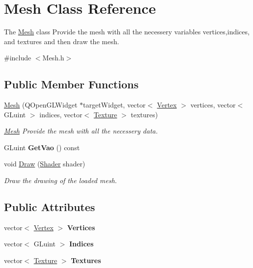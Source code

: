 \hypertarget{class_mesh}{}\section{Mesh Class Reference}
\label{class_mesh}


The \hyperlink{class_mesh}{Mesh} class Provide the mesh with all the necessery variables vertices,indices, and textures and then draw the mesh.  




{\ttfamily \#include $<$Mesh.\+h$>$}

\subsection*{Public Member Functions}
\begin{DoxyCompactItemize}
\item 
\hyperlink{class_mesh_a9a4b7f1b6b50b9ad7e80c5d61d2b221b}{Mesh} (Q\+Open\+G\+L\+Widget $\ast$target\+Widget, vector$<$ \hyperlink{struct_vertex}{Vertex} $>$ vertices, vector$<$ G\+Luint $>$ indices, vector$<$ \hyperlink{struct_texture}{Texture} $>$ textures)
\begin{DoxyCompactList}\small\item\em \hyperlink{class_mesh}{Mesh} Provide the mesh with all the necessery data. \end{DoxyCompactList}\item 
\hypertarget{class_mesh_a7a01e69fcc56f348f7c91e1420b14e0e}{}G\+Luint {\bfseries Get\+Vao} () const \label{class_mesh_a7a01e69fcc56f348f7c91e1420b14e0e}

\item 
void \hyperlink{class_mesh_a143c8d7c179801c6377853db26d4a19f}{Draw} (\hyperlink{class_shader}{Shader} shader)
\begin{DoxyCompactList}\small\item\em Draw the drawing of the loaded mesh. \end{DoxyCompactList}\end{DoxyCompactItemize}
\subsection*{Public Attributes}
\begin{DoxyCompactItemize}
\item 
\hypertarget{class_mesh_abd28c74398f02e1afaa959c40bdd6df0}{}vector$<$ \hyperlink{struct_vertex}{Vertex} $>$ {\bfseries Vertices}\label{class_mesh_abd28c74398f02e1afaa959c40bdd6df0}

\item 
\hypertarget{class_mesh_ae293e39cb11bde8d46fe77ef622893bd}{}vector$<$ G\+Luint $>$ {\bfseries Indices}\label{class_mesh_ae293e39cb11bde8d46fe77ef622893bd}

\item 
\hypertarget{class_mesh_a10fa55f46fc6c5bb237525ed5343e73c}{}vector$<$ \hyperlink{struct_texture}{Texture} $>$ {\bfseries Textures}\label{class_mesh_a10fa55f46fc6c5bb237525ed5343e73c}

\end{DoxyCompactItemize}


